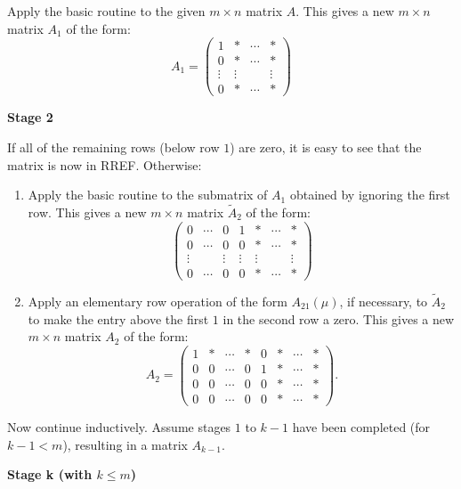 \documentclass[10pt, a4paper]{article}
\begin{document}
Apply the basic routine to the given $m \times n$ matrix $A$.
This gives a new $m \times n$ matrix $A_1$ of the form:
\[
A_1 =
\begin{pmatrix}
    1 & * & \dotsi & * \\
    0 & * & \dotsi & * \\
    \vdots & \vdots & \phantom{} & \vdots \\
    0 & * & \dotsi & *
\end{pmatrix}
\]

\textbf{Stage 2}

If all of the remaining rows (below row $1$) are zero, it is easy to see that the matrix is now in RREF.
Otherwise:
\begin{enumerate}[label = (\roman*).]
    \item Apply the basic routine to the submatrix of $A_1$ obtained by ignoring the first row.
    This gives a new $m \times n$ matrix $\tilde{A}_2$ of the form:
    \[
    \begin{pmatrix}
        0 & \dotsi & 0 & 1 & * & \dotsi & * \\
        0 & \dotsi & 0 & 0 & * & \dotsi & * \\
        \vdots & \phantom{} & \vdots & \vdots & \vdots & \phantom{} & \vdots \\
        0 & \dotsi & 0 & 0 & * & \dotsi & *
    \end{pmatrix}
    \]
    \item Apply an elementary row operation of the form $A_{2 1}(\mu)$,
    if necessary, to $\tilde{A}_2$ to make the entry above the first $1$ in the second row a zero.
    This gives a new $m \times n$ matrix $A_2$ of the form:
    \[
    A_2 = 
    \begin{pmatrix}
        1 & * & \dotsi & * & 0 & * & \dotsi & * \\
        0 & 0 & \dotsi & 0 & 1 & * & \dotsi & * \\
        0 & 0 & \dotsi & 0 & 0 & * & \dotsi & * \\
        0 & 0 & \dotsi & 0 & 0 & * & \dotsi & *
    \end{pmatrix}.
    \]
\end{enumerate}
Now continue inductively.
Assume stages $1$ to $k - 1$ have been completed (for $k - 1 < m$),
resulting in a matrix $A_{k - 1}$.

\textbf{Stage k (with $k \leq m$)}
\end{document}
